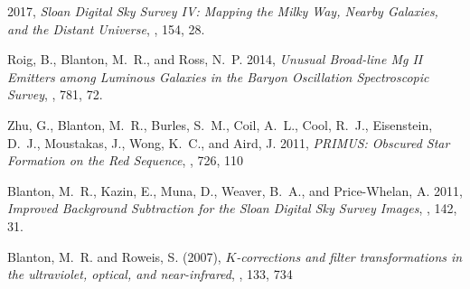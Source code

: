 \documentclass[12pt, preprint]{hacked-aastex}
\newenvironment{ditemize}
{ \begin{list}{}{%
\setlength{\topsep}{0pt}%
\setlength{\partopsep}{3pt}%
\setlength{\itemsep}{1pt}\setlength{\parsep}{1pt}%
\setlength{\itemindent}{0pt}\setlength{\listparindent}{12pt}%
\setlength{\leftmargin}{24pt}\setlength{\rightmargin}{0in}%
\setlength{\labelsep}{6pt}\setlength{\labelwidth}{6pt}%
\renewcommand{\makelabel}{\makebox[\labelwidth][l]{$\bullet$\hspace{\fill}}}}}
{\end{list}}
\begin{document}
\begin{ditemize}
  2017, 
  \textit{{Sloan
   Digital Sky Survey IV: Mapping the Milky Way, Nearby Galaxies, and the
  Distant Universe}}, \aj, 154, 28.
\item  {Roig}, B., {Blanton}, M.~R., and {Ross}, N.~P. 2014,
  \textit{{Unusual Broad-line Mg II Emitters among Luminous Galaxies in the
  Baryon Oscillation Spectroscopic Survey}}, \apj, 781, 72.
\item 
 {Zhu}, G., {Blanton}, M.~R., {Burles}, S.~M., {Coil}, A.~L.,
  {Cool}, R.~J., {Eisenstein}, D.~J., {Moustakas}, J., {Wong}, K.~C., and
  {Aird}, J. 2011, \textit{{PRIMUS: Obscured Star Formation on the Red
  Sequence}}, \apj, 726, 110
\item {Blanton}, M.~R., {Kazin}, E., {Muna}, D., {Weaver}, B.~A., and
  {Price-Whelan}, A. 2011, \textit{{Improved Background Subtraction for the
  Sloan Digital Sky Survey Images}}, \aj, 142, 31.
\item 
Blanton, M.~R. and Roweis, S. (2007), {\it $K$-corrections and filter
transformations in the ultraviolet, optical, and near-infrared}, \aj,
133, 734
\end{ditemize}
\end{document}
